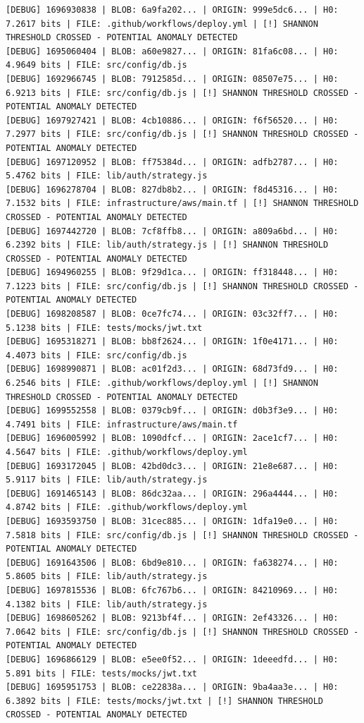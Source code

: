 \documentclass[12pt, a4paper, oneside]{report}
\begin{document}
\begin{lstlisting}[basicstyle=\tiny\ttfamily]
[DEBUG] 1696930838 | BLOB: 6a9fa202... | ORIGIN: 999e5dc6... | H0: 7.2617 bits | FILE: .github/workflows/deploy.yml | [!] SHANNON THRESHOLD CROSSED - POTENTIAL ANOMALY DETECTED
[DEBUG] 1695060404 | BLOB: a60e9827... | ORIGIN: 81fa6c08... | H0: 4.9649 bits | FILE: src/config/db.js
[DEBUG] 1692966745 | BLOB: 7912585d... | ORIGIN: 08507e75... | H0: 6.9213 bits | FILE: src/config/db.js | [!] SHANNON THRESHOLD CROSSED - POTENTIAL ANOMALY DETECTED
[DEBUG] 1697927421 | BLOB: 4cb10886... | ORIGIN: f6f56520... | H0: 7.2977 bits | FILE: src/config/db.js | [!] SHANNON THRESHOLD CROSSED - POTENTIAL ANOMALY DETECTED
[DEBUG] 1697120952 | BLOB: ff75384d... | ORIGIN: adfb2787... | H0: 5.4762 bits | FILE: lib/auth/strategy.js
[DEBUG] 1696278704 | BLOB: 827db8b2... | ORIGIN: f8d45316... | H0: 7.1532 bits | FILE: infrastructure/aws/main.tf | [!] SHANNON THRESHOLD CROSSED - POTENTIAL ANOMALY DETECTED
[DEBUG] 1697442720 | BLOB: 7cf8ffb8... | ORIGIN: a809a6bd... | H0: 6.2392 bits | FILE: lib/auth/strategy.js | [!] SHANNON THRESHOLD CROSSED - POTENTIAL ANOMALY DETECTED
[DEBUG] 1694960255 | BLOB: 9f29d1ca... | ORIGIN: ff318448... | H0: 7.1223 bits | FILE: src/config/db.js | [!] SHANNON THRESHOLD CROSSED - POTENTIAL ANOMALY DETECTED
[DEBUG] 1698208587 | BLOB: 0ce7fc74... | ORIGIN: 03c32ff7... | H0: 5.1238 bits | FILE: tests/mocks/jwt.txt
[DEBUG] 1695318271 | BLOB: bb8f2624... | ORIGIN: 1f0e4171... | H0: 4.4073 bits | FILE: src/config/db.js
[DEBUG] 1698990871 | BLOB: ac01f2d3... | ORIGIN: 68d73fd9... | H0: 6.2546 bits | FILE: .github/workflows/deploy.yml | [!] SHANNON THRESHOLD CROSSED - POTENTIAL ANOMALY DETECTED
[DEBUG] 1699552558 | BLOB: 0379cb9f... | ORIGIN: d0b3f3e9... | H0: 4.7491 bits | FILE: infrastructure/aws/main.tf
[DEBUG] 1696005992 | BLOB: 1090dfcf... | ORIGIN: 2ace1cf7... | H0: 4.5647 bits | FILE: .github/workflows/deploy.yml
[DEBUG] 1693172045 | BLOB: 42bd0dc3... | ORIGIN: 21e8e687... | H0: 5.9117 bits | FILE: lib/auth/strategy.js
[DEBUG] 1691465143 | BLOB: 86dc32aa... | ORIGIN: 296a4444... | H0: 4.8742 bits | FILE: .github/workflows/deploy.yml
[DEBUG] 1693593750 | BLOB: 31cec885... | ORIGIN: 1dfa19e0... | H0: 7.5818 bits | FILE: src/config/db.js | [!] SHANNON THRESHOLD CROSSED - POTENTIAL ANOMALY DETECTED
[DEBUG] 1691643506 | BLOB: 6bd9e810... | ORIGIN: fa638274... | H0: 5.8605 bits | FILE: lib/auth/strategy.js
[DEBUG] 1697815536 | BLOB: 6fc767b6... | ORIGIN: 84210969... | H0: 4.1382 bits | FILE: lib/auth/strategy.js
[DEBUG] 1698605262 | BLOB: 9213bf4f... | ORIGIN: 2ef43326... | H0: 7.0642 bits | FILE: src/config/db.js | [!] SHANNON THRESHOLD CROSSED - POTENTIAL ANOMALY DETECTED
[DEBUG] 1696866129 | BLOB: e5ee0f52... | ORIGIN: 1deeedfd... | H0: 5.891 bits | FILE: tests/mocks/jwt.txt
[DEBUG] 1695951753 | BLOB: ce22838a... | ORIGIN: 9ba4aa3e... | H0: 6.3892 bits | FILE: tests/mocks/jwt.txt | [!] SHANNON THRESHOLD CROSSED - POTENTIAL ANOMALY DETECTED
\end{lstlisting}
\end{document}
